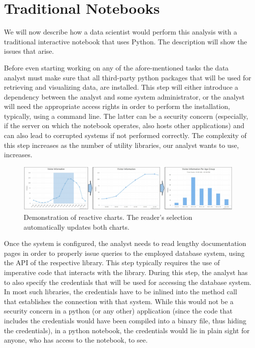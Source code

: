 \section{Traditional Notebooks}



We will now describe how a data scientist would perform this analysis with a traditional interactive notebook that uses Python. The description will show the issues that arise.

 Before even starting working on any of the afore-mentioned tasks the data analyst must make sure that all third-party python packages that will be used for retrieving and visualizing data, are installed. This step will either introduce a dependency between the analyst and some system administrator, or the analyst will need the appropriate access rights in order to perform the installation, typically, using a command line. The latter can be a security concern (especially, if the server on which the notebook operates, also hosts other applications) and can also lead to corrupted systems if not performed correctly. The complexity of this step increases as the number of utility libraries, our analyst wants to use, increases. 

\begin{figure}[hbt!]
\centering
	\includegraphics[width=1\textwidth]{figures/reactive-processing2.pdf}
	\caption{Demonstration of reactive charts. The reader's selection automatically updates both charts.}
	\label{fig:reactive-data-processing}
\end{figure}


Once the system is configured, the analyst needs to read lengthy documentation pages in order to properly issue queries to the employed database system, using the API of the respective library. This step typically requires the use of imperative code that interacts with the library. During this step, the analyst has to also specify the credentials that will be used for accessing the database system. In most such libraries, the credentials have to be inlined into the method call that establishes the connection with that system. While this would not be a security concern in a python (or any other) application (since the code that includes the credentials would have been compiled into a binary file, thus hiding the credentials), in a python notebook, the credentials would lie in plain sight for anyone, who has access to the notebook, to see.

